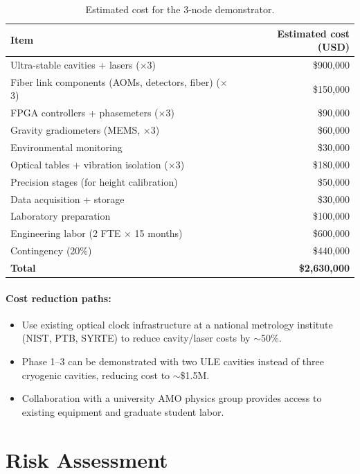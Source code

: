 \documentclass[12pt,letterpaper]{article}
\begin{document}
\begin{table}[h]
\centering
\caption{Estimated cost for the 3-node demonstrator.}
\label{tab:cost}
\begin{tabular}{@{}lr@{}}
\toprule
Item & Estimated cost (USD) \\
\midrule
Ultra-stable cavities + lasers ($\times$3) & \$900,000 \\
Fiber link components (AOMs, detectors, fiber) ($\times$3) & \$150,000 \\
FPGA controllers + phasemeters ($\times$3) & \$90,000 \\
Gravity gradiometers (MEMS, $\times$3) & \$60,000 \\
Environmental monitoring & \$30,000 \\
Optical tables + vibration isolation ($\times$3) & \$180,000 \\
Precision stages (for height calibration) & \$50,000 \\
Data acquisition + storage & \$30,000 \\
Laboratory preparation & \$100,000 \\
Engineering labor (2 FTE $\times$ 15 months) & \$600,000 \\
Contingency (20\%) & \$440,000 \\
\midrule
\textbf{Total} & \textbf{\$2,630,000} \\
\bottomrule
\end{tabular}
\end{table}

\paragraph{Cost reduction paths:}
\begin{itemize}
\item Use existing optical clock infrastructure at a national metrology
institute (NIST, PTB, SYRTE) to reduce cavity/laser costs by $\sim$50\%.
\item Phase 1--3 can be demonstrated with two ULE cavities instead of
three cryogenic cavities, reducing cost to $\sim$\$1.5M.
\item Collaboration with a university AMO physics group provides
access to existing equipment and graduate student labor.
\end{itemize}

\section{Risk Assessment}
\end{document}
